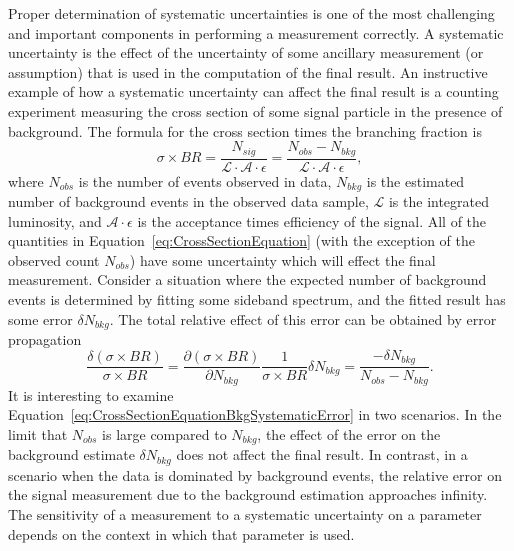 Proper determination of systematic uncertainties is one of the most challenging
and important components in performing a measurement correctly.  A systematic
uncertainty is the effect of the uncertainty of some ancillary measurement (or
assumption) that is used in the computation of the final result.  An instructive
example of how a systematic uncertainty can affect the final result is a
counting experiment measuring the cross section of some signal particle in the
presence of background.  The formula for the cross section times the branching
fraction is
\begin{equation}
  \sigma \times BR = \frac{N_{sig}}{\mathcal{L} \cdot \mathcal {A} \cdot
  \epsilon} = \frac{N_{obs}-N_{bkg}}{\mathcal{L} \cdot \mathcal {A} \cdot
  \epsilon}, \label{eq:CrossSectionEquation}
\end{equation}
where $N_{obs}$ is the number of events observed in data, $N_{bkg}$ is the
estimated number of background events in the observed data sample, $\mathcal{L}$
is the integrated luminosity, and $\mathcal{A} \cdot \epsilon$ is the acceptance
times efficiency of the signal.  All of the quantities in
Equation~\ref{eq:CrossSectionEquation} (with the exception of the observed
count $N_{obs}$) have some uncertainty which will effect the final measurement.
Consider a situation where the expected number of background events is
determined by fitting some sideband spectrum, and the fitted result has some
error $\delta N_{bkg}$.  The total relative effect of this error can
be obtained by error propagation
\begin{equation}
  \frac{\delta (\sigma \times BR)}{\sigma \times BR} = \frac{\partial(\sigma
  \times BR)}{\partial N_{bkg}}  \frac{1}{\sigma \times BR} \delta N_{bkg} =
  \frac{-\delta N_{bkg}} {N_{obs}-N_{bkg}}.
  \label{eq:CrossSectionEquationBkgSystematicError}
\end{equation}
It is interesting to examine
Equation~\ref{eq:CrossSectionEquationBkgSystematicError} in two scenarios.  In
the limit that $N_{obs}$ is large compared to $N_{bkg}$, the effect of the error
on the background estimate $\delta N_{bkg}$ does not affect the final result.
In contrast, in a scenario when the data is dominated by background events, the
relative error on the signal measurement due to the background estimation
approaches infinity.  The sensitivity of a measurement to a systematic
uncertainty on a parameter depends on the context in which that parameter is
used.

